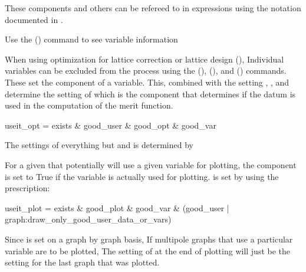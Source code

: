 These components and others can be refereed to in expressions using the notation documented
in .

Use the  () command to see variable information

When using optimization for lattice correction or lattice design (), Individual
variables can be excluded from the process using the  (), 
(), and  () commands. These set the  component of
a variable. This, combined with the setting , , and  determine
the setting of  which is the component that determines if the datum is used in the
computation of the merit function.
\begin{example}
  useit_opt = exists \& good_user \& good_opt \& good_var
\end{example}
The settings of everything but  and  is determined by \tao

For a given  that potentially will use a given variable for plotting, 
the  component is set to True if the variable is actually used for plotting.
 is set by \tao using the prescription:
\begin{example}
  useit_plot = exists \& good_plot \& good_var \& 
                            (good_user | graph:draw_only_good_user_data_or_vars)
\end{example}
Since  is set on a graph by graph basis, If multipole graphs that use a particular
variable are to be plotted, The setting of  at the end of plotting will just be
the setting for the last graph that was plotted.
